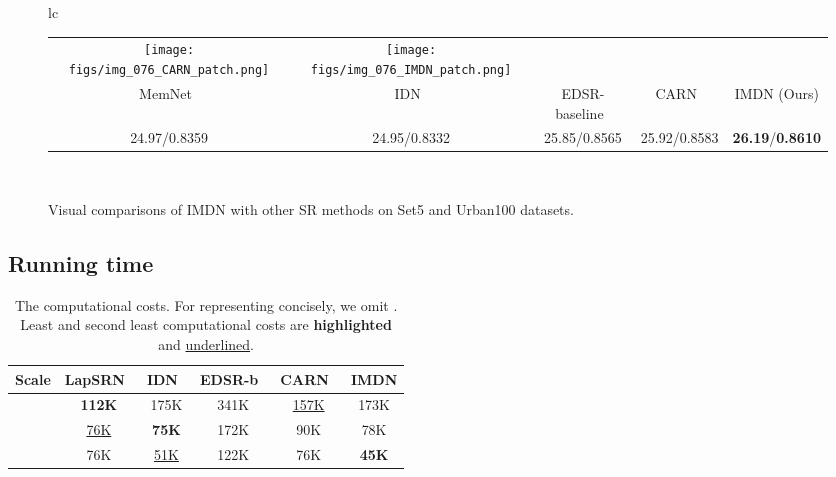 \documentclass[sigconf]{acmart}
\begin{document}
\begin{figure*}[htpb]
{\begin{tabular}{lc}
\begin{adjustbox}{valign=t}
\begin{tabular}{ccccc}
					\hspace{-3mm}
					\texttt{[image: figs/img\_076\_CARN\_patch.png]} &
					\hspace{-3mm}
					\texttt{[image: figs/img\_076\_IMDN\_patch.png]} \\
					MemNet~\cite{MemNet} & \hspace{-3mm}
					IDN~\cite{IDN} & \hspace{-3mm}
					EDSR-baseline~\cite{EDSR} & \hspace{-3mm}
					CARN~\cite{CARN} & \hspace{-3mm}
					IMDN (Ours) \\
					24.97/0.8359 & \hspace{-3mm}
					24.95/0.8332 & \hspace{-3mm}
					25.85/0.8565 & \hspace{-3mm}
					25.92/0.8583 & \hspace{-3mm}
					\textbf{26.19}/\textbf{0.8610} \\
				\end{tabular}
			\end{adjustbox}
			\\
			
	\end{tabular} }
	\vspace{-3mm}
	\caption{Visual comparisons of IMDN with other SR methods on Set5 and Urban100 datasets.}
	\label{fig:visual-comparison}
\end{figure*}

\subsection{Running time}

\begin{table}[htpb]
	\centering
	\small
	\vspace{-3mm}
	\caption{The computational costs. For representing concisely, we omit . Least and second least computational costs are \textbf{highlighted} and \underline{underlined}.}
	\label{tab:computational-costs}
	\begin{tabular}{|c|c|c|c|c|c|}
		\hline
		Scale & LapSRN~\cite{LapSRN} & IDN~\cite{IDN} & EDSR-b~\cite{EDSR} & CARN~\cite{CARN} & IMDN \\
		\hline
		\hline
		 & \textbf{112K} & 175K & 341K & \underline{157K} & 173K \\
		 & \underline{76K} & \textbf{75K} & 172K & 90K & 78K \\
		 & 76K & \underline{51K} & 122K & 76K & \textbf{45K} \\
		\hline
	\end{tabular}
\end{table}
\end{document}
